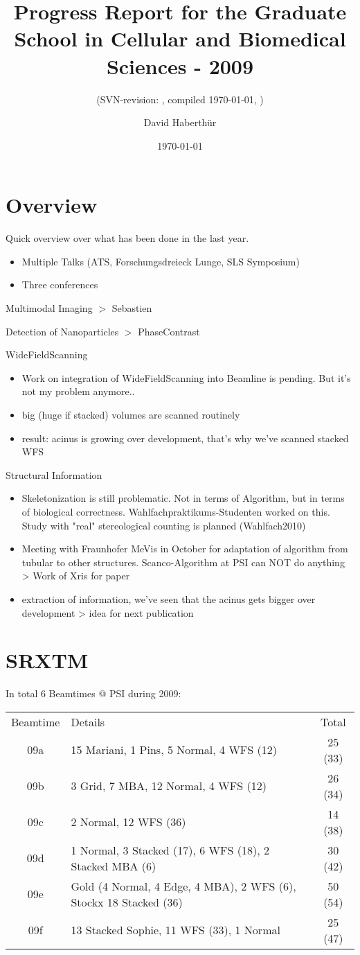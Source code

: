 \documentclass[a4paper,twoside,english,DIV=calc]{scrartcl}
\title{Progress Report for the Graduate School in Cellular and Biomedical Sciences - 2009}
\subtitle{(SVN-revision: \svnkw{LastChangedRevision}, compiled \today, \thistime)}
\author{David Haberthür}
\date{\today}
\begin{document}
\maketitle

\section{Overview}
Quick overview over what has been done in the last year.
\begin{itemize}
\item Multiple Talks (ATS, Forschungsdreieck Lunge, SLS Symposium)
\item Three conferences
\end{itemize}

Multimodal Imaging $>$ Sebastien

Detection of Nanoparticles $>$ PhaseContrast

WideFieldScanning
\begin{itemize}
\item Work on integration of WideFieldScanning into Beamline is pending. But it's not my problem anymore..
\item big (huge if stacked) volumes are scanned routinely
\item result: acinus is growing over development, that's why we've scanned stacked WFS
\end{itemize}

Structural Information
\begin{itemize}
\item Skeletonization is still problematic. Not in terms of Algorithm, but in terms of biological correctness. Wahlfachpraktikums-Studenten worked on this. Study with "real" stereological counting is planned (Wahlfach2010)
\item Meeting with Fraunhofer MeVis in October for adaptation of algorithm from tubular to other structures. Scanco-Algorithm at PSI can NOT do anything > Work of Xris for paper
\item extraction of information, we've seen that the acinus gets bigger over development > idea for next publication
\end{itemize}

\section{SRXTM}
In total 6 Beamtimes @ PSI during 2009:

\begin{tabular}{clc}
Beamtime & Details & Total\\
09a & 15 Mariani, 1 Pins, 5 Normal, 4 WFS (12) & 25 (33)\\
09b & 3 Grid, 7 MBA, 12 Normal, 4 WFS (12) & 26 (34)\\
09c & 2 Normal, 12 WFS (36) & 14 (38)\\
09d & 1 Normal, 3 Stacked (17), 6 WFS (18), 2 Stacked MBA (6) & 30 (42)\\
09e & Gold (4 Normal, 4 Edge, 4 MBA), 2 WFS (6), Stockx 18 Stacked (36) & 50 (54)\\
09f & 13 Stacked Sophie, 11 WFS (33), 1 Normal & 25 (47)\\
\end{tabular}
\end{document}

